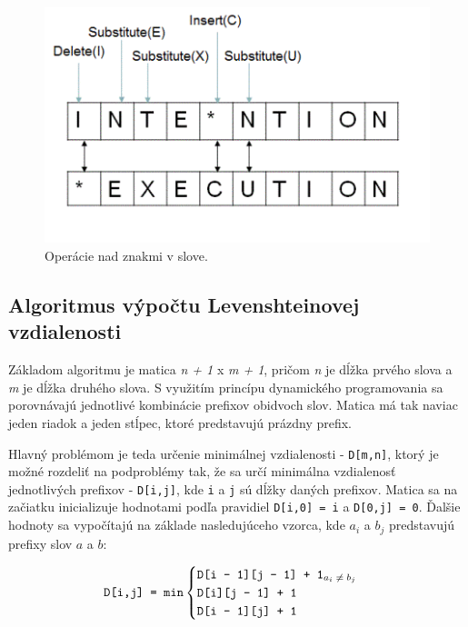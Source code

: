 \documentclass[
  digital, %
  table,   %
  lof,     %
  lot,     %
]{fithesis3}
\begin{document}
\begin{figure}
	\begin{center}
	\includegraphics[width=\textwidth]{img/distance.png}
	\end{center}
    \caption{Operácie nad znakmi v slove.}
	\label{fig:levenshtein}
\end{figure}

\subsection{Algoritmus výpočtu Levenshteinovej vzdialenosti}
Základom algoritmu je matica \textit{n + 1} x \textit{m + 1}, pričom \textit{n} je dĺžka prvého slova a \textit{m} je dĺžka druhého slova. S využitím princípu dynamického programovania sa porovnávajú jednotlivé kombinácie prefixov obidvoch slov. Matica má tak naviac jeden riadok a jeden stĺpec, ktoré predstavujú prázdny prefix.

Hlavný problémom je teda určenie minimálnej vzdialenosti - \texttt{D[m,n]}, ktorý je možné rozdeliť na podproblémy tak, že sa určí minimálna vzdialenosť jednotlivých prefixov - \texttt{D[i,j]}, kde \texttt{i} a \texttt{j} sú dĺžky daných prefixov. Matica sa na začiatku inicializuje hodnotami podľa pravidiel \texttt{D[i,0] = i} a \texttt{D[0,j] = 0}. Ďalšie hodnoty sa vypočítajú na základe nasledujúceho vzorca, kde $a_i$ a $b_j$ predstavujú prefixy slov $a$ a $b$:

 \begin{equation}
 \texttt{D[i,j] = min}\begin{cases}
       \texttt{D[i - 1][j - 1] + 1\textsubscript{$a_i \neq b_j$}} \\
       \texttt{D[i][j - 1] + 1} \\
       \texttt{D[i - 1][j] + 1}
       \end{cases}
 \end{equation}
\end{document}
